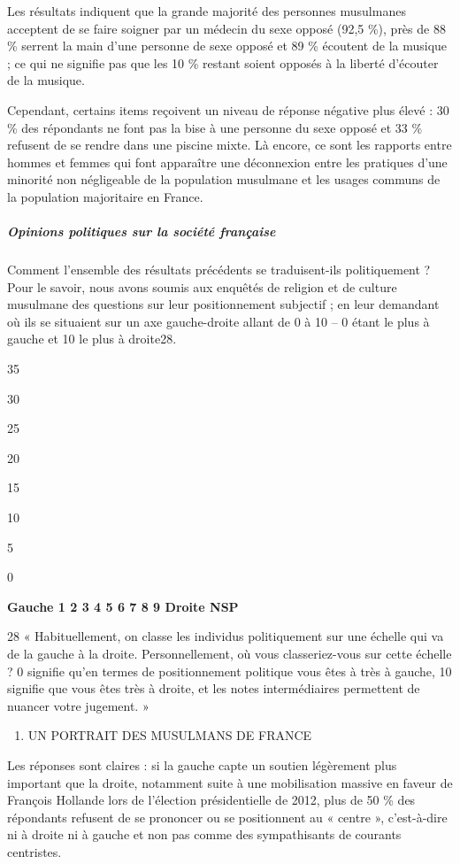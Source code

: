Les résultats indiquent que la grande majorité des personnes musulmanes
acceptent de se faire soigner par un médecin du sexe opposé (92,5 \%),
près de 88 \% serrent la main d'une personne de sexe opposé et 89 \%
écoutent de la musique ; ce qui ne signifie pas que les 10 \% restant
soient opposés à la liberté d'écouter de la musique.

Cependant, certains items reçoivent un niveau de réponse négative plus
élevé : 30 \% des répondants ne font pas la bise à une personne du sexe
opposé et 33 \% refusent de se rendre dans une piscine mixte. Là encore,
ce sont les rapports entre hommes et femmes qui font apparaître une
déconnexion entre les pratiques d'une minorité non négligeable de la
population musulmane et les usages communs de la population majoritaire
en France.


\hypertarget{opinions-politiques-sur-la-sociuxe9tuxe9-franuxe7aise}{%
\subparagraph{Opinions politiques sur la société
française}\label{opinions-politiques-sur-la-sociuxe9tuxe9-franuxe7aise}}


Comment l'ensemble des résultats précédents se traduisent-ils
politiquement ? Pour le savoir, nous avons soumis aux enquêtés de
religion et de culture musulmane des questions sur leur positionnement
subjectif ; en leur demandant où ils se situaient sur un axe
gauche-droite allant de 0 à 10 -- 0 étant le plus à gauche et 10 le plus
à droite28.

35

30

25

20

15

10

5

0

\textbf{Gauche 1 2 3 4 5 6 7 8 9 Droite NSP}

28 « Habituellement, on classe les individus politiquement sur une
échelle qui va de la gauche à la droite. Personnellement, où vous
classeriez-vous sur cette échelle ? 0 signifie qu'en termes de
positionnement politique vous êtes à très à gauche, 10 signifie que vous
êtes très à droite, et les notes intermédiaires permettent de nuancer
votre jugement. »


\begin{enumerate}
\def\labelenumi{\Roman{enumi}.}
\item
  UN PORTRAIT DES MUSULMANS DE FRANCE
\end{enumerate}


Les réponses sont claires : si la gauche capte un soutien légèrement
plus important que la droite, notamment suite à une mobilisation massive
en faveur de François Hollande lors de l'élection présidentielle de
2012, plus de 50 \% des répondants refusent de se prononcer ou se
positionnent au « centre », c'est-à-dire ni à droite ni à gauche et non
pas comme des sympathisants de courants centristes.


